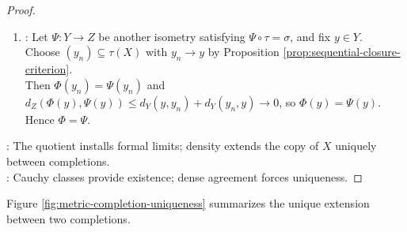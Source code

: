 \begin{theorem}
\begin{proof}
\begin{enumerate}[label=(\roman*)]
\begin{enumerate}[label=(\alph*)]
Hence $\Phi(Y)$ is closed in $Z$ by Proposition \ref{prop:basic-completeness-consequences}(i).\\
The inclusions $\sigma(X)\subseteq\Phi(Y)$ and $Z=\overline{\sigma(X)}^{\,Z}$ imply $Z\subseteq\Phi(Y)$ by Theorem \ref{thm:closure-smallest-closed-containing-set}(iii).\\
Thus $\Phi$ is surjective; since every isometry is injective, it is bijective.
\item {}: Let $\Psi:Y\to Z$ be another isometry satisfying $\Psi\circ\tau=\sigma$, and fix $y\in Y$.\\
Choose $(y_n)\subseteq\tau(X)$ with $y_n\to y$ by Proposition \ref{prop:sequential-closure-criterion}.\\
Then $\Phi(y_n)=\Psi(y_n)$ and $d_Z(\Phi(y),\Psi(y))\leq d_Y(y,y_n)+d_Y(y_n,y)\to0$, so $\Phi(y)=\Psi(y)$. Hence $\Phi=\Psi$.
\end{enumerate}
\end{enumerate}
: The quotient installs formal limits; density extends the copy of $X$ uniquely between completions.\\
: Cauchy classes provide existence; dense agreement forces uniqueness.
\end{proof}
\end{theorem}

Figure \ref{fig:metric-completion-uniqueness} summarizes the unique extension between two completions.
\begin{illustrationfigure}[H]
  \centering
  
  \caption{The dense-copy isometry $\sigma\tau^{-1}$ extends uniquely to $\Phi:Y\cong Z$; adapted from \citet[Ch.~12, Fig.~12.4]{roman2008advanced}.}
  \label{fig:metric-completion-uniqueness}
\end{illustrationfigure}
